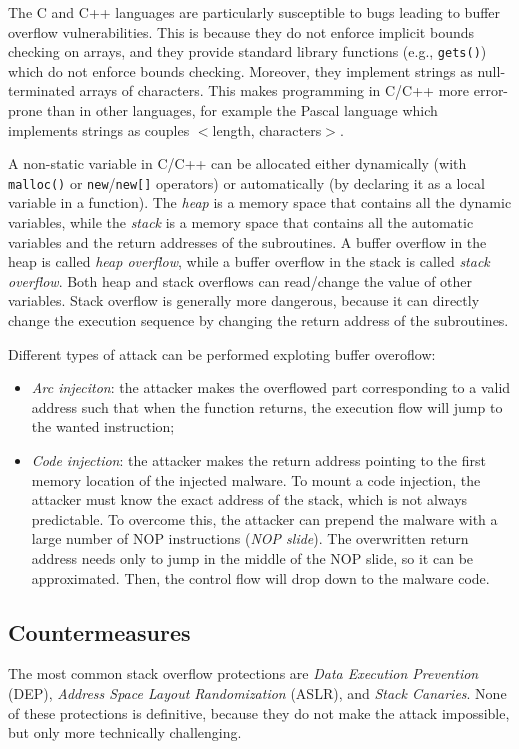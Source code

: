 \documentclass[a4paper,12pt]{article}
\begin{document}
The C and C++ languages are particularly susceptible to bugs leading to buffer overflow vulnerabilities. This is because they do not enforce implicit bounds checking on arrays, and they provide standard library functions (e.g., \texttt{gets()}) which do not enforce bounds checking. Moreover, they implement strings as null-terminated arrays of characters. This makes programming in C/C++ more error-prone than in other languages, for example the Pascal language which implements strings as couples $<$length, characters$>$.

A non-static variable in C/C++ can be allocated either dynamically (with \texttt{malloc()} or \texttt{new}/\texttt{new[]} operators) or automatically (by declaring it as a local variable in a function). The \textit{heap} is a memory space that contains all the dynamic variables, while the \textit{stack} is a memory space that contains all the automatic variables and the return addresses of the subroutines. A buffer overflow in the heap is called \textit{heap overflow}, while a buffer overflow in the stack is called \textit{stack overflow}. Both heap and stack overflows can read/change the value of other variables. Stack overflow is generally more dangerous, because it can directly change the execution sequence by changing the return address of the subroutines.

Different types of attack can be performed exploting buffer overoflow:
\begin{itemize}
	\item \textit{Arc injeciton}: the attacker makes the overflowed part corresponding to a valid address such that when the function returns, the execution flow will jump to the wanted instruction;
	\item \textit{Code injection}: the attacker makes the return address pointing to the first memory location of the injected malware. To mount a code injection, the attacker must know the exact address of the stack, which is not always predictable. To overcome this, the attacker can prepend the malware with a large number of NOP instructions (\textit{NOP slide}). The overwritten return address needs only to jump in the middle of the NOP slide, so it can be approximated. Then, the control flow will drop down to the malware code.
\end{itemize}

\subsection{Countermeasures}
The most common stack overflow protections are \textit{Data Execution Prevention} (DEP), \textit{Address Space Layout Randomization} (ASLR), and \textit{Stack Canaries}. None of these protections is definitive, because they do not make the attack impossible, but only more technically challenging.
\end{document}
